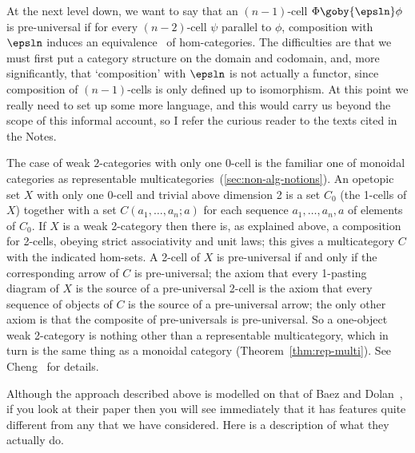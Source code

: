 At the next level down, we want to say that an $(n-1)$-cell $\Phi
\goby{\epsln} \phi$ is pre-universal if for every $(n-2)$-cell $\psi$
parallel to $\phi$, composition with $\epsln$ induces an
equivalence~ of hom-categories.  The difficulties are
that we must first put a category structure on the domain and codomain,
and, more significantly, that `composition' with $\epsln$ is not actually a
functor, since composition of $(n-1)$-cells is only defined up to
isomorphism.  At this point we really need to set up some more language,
and this would carry us beyond the scope of this informal account, so I
refer the curious reader to the texts cited in the Notes.

The case of weak $2$-categories with only one $0$-cell is the familiar one
of monoidal categories as representable%
%
%
multicategories~(\ref{sec:non-alg-notions}).  An opetopic set $X$ with only
one 0-cell and trivial above dimension 2 is a set $C_0$ (the 1-cells of
$X$) together with a set $C(a_1, \ldots, a_n; a) $ for each sequence
$a_1, \ldots, a_n, a$ of elements of $C_0$.  If $X$ is a weak 2-category
then there is, as explained above, a composition for 2-cells, obeying
strict associativity and unit laws; this gives a multicategory $C$ with the
indicated hom-sets.  A 2-cell of $X$ is pre-universal if and only if the
corresponding arrow of $C$ is pre-universal; the axiom that every 1-pasting
diagram of $X$ is the source of a pre-universal 2-cell is the axiom that
every sequence of objects of $C$ is the source of a pre-universal arrow;
the only other axiom is that the composite of pre-universals is
pre-universal.  So a one-object weak 2-category is nothing other than a
representable multicategory, which in turn is the same thing as a monoidal
category (Theorem~\ref{thm:rep-multi}).  See Cheng~\cite{CheOBC} for
details. 

Although the approach described above is modelled on that of Baez%
%
%
and
Dolan~\cite{BDHDA3},%
%
%
if you look at their paper then you will see
immediately that it has features quite different from any that we have
considered.  Here is a description of what they actually do.

